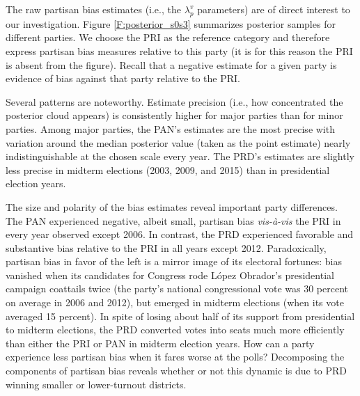 \documentclass[letter,12pt]{article}
\begin{document}
{%

The raw partisan bias estimates (i.e., the $\lambda_p^v$ parameters) are of direct interest to our investigation. Figure \ref{F:posterior_s0s3} summarizes posterior samples for different parties. We choose the PRI as the reference category and therefore express partisan bias measures relative to this party (it is for this reason the PRI is absent from the figure). Recall that a negative estimate for a given party is evidence of bias against that party relative to the PRI. 

Several patterns are noteworthy. Estimate precision (i.e., how concentrated the posterior cloud appears) is consistently higher for major parties than for minor parties. Among major parties, the PAN's estimates are the most precise with variation around the median posterior value (taken as the point estimate) nearly indistinguishable at the chosen scale every year. The PRD's estimates are slightly less precise in midterm elections (2003, 2009, and 2015) than in presidential election years.  

The size and polarity of the bias estimates reveal important party differences. The PAN experienced negative, albeit small, partisan bias \emph{vis-\`a-vis} the PRI in every year observed except 2006. In contrast, the PRD experienced favorable and substantive bias relative to the PRI in all years except 2012. Paradoxically, partisan bias in favor of the left is a mirror image of its electoral fortunes: bias vanished when its candidates for Congress rode L\'opez Obrador's presidential campaign coattails twice (the party's national congressional vote was 30 percent on average in 2006 and 2012), but emerged in midterm elections (when its vote averaged 15 percent). In spite of losing about half of its support from presidential to midterm elections, the PRD converted votes into seats much more efficiently than either the PRI or PAN in midterm election years. How can a party experience less partisan bias when it fares worse at the polls? Decomposing the components of partisan bias reveals whether or not this dynamic is due to PRD winning smaller or lower-turnout districts.


}
\end{document}
